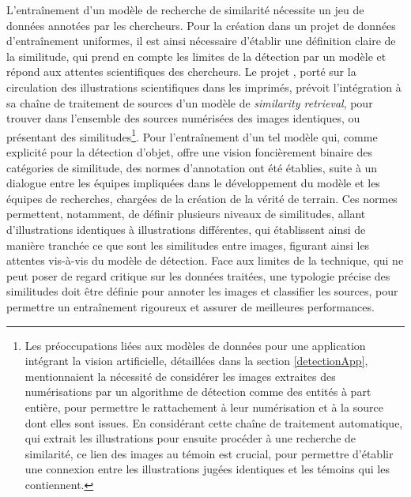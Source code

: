 	L'entraînement d'un modèle de recherche de similarité nécessite un jeu de données annotées par les chercheurs. Pour la création dans un projet de données d'entraînement uniformes, il est ainsi nécessaire d'établir une définition claire de la similitude, qui prend en compte les limites de la détection par un modèle et répond aux attentes scientifiques des chercheurs. Le projet \vhs, porté sur la circulation des illustrations scientifiques dans les imprimés, prévoit l'intégration à sa chaîne de traitement de sources d'un modèle de \textit{similarity retrieval}, pour trouver dans l'ensemble des sources numérisées des images identiques, ou présentant des similitudes\footnote{Les préoccupations liées aux modèles de données pour une application intégrant la vision artificielle, détaillées dans la section \ref{detectionApp}, mentionnaient la nécessité de considérer les images extraites des numérisations par un algorithme de détection comme des entités à part entière, pour permettre le rattachement à leur numérisation et à la source dont elles sont issues. En considérant cette chaîne de traitement automatique, qui extrait les illustrations pour ensuite procéder à une recherche de similarité, ce lien des images au témoin est crucial, pour permettre d'établir une connexion entre les illustrations jugées identiques et les témoins qui les contiennent.}. Pour l'entraînement d'un tel modèle qui, comme explicité pour la détection d'objet, offre une vision foncièrement binaire des catégories de similitude, des normes d'annotation ont été établies, suite à un dialogue entre les équipes impliquées dans le développement du modèle et les équipes de recherches, chargées de la création de la vérité de terrain. Ces normes permettent, notamment, de définir plusieurs niveaux de similitudes, allant d'illustrations identiques à illustrations différentes, qui établissent ainsi de manière tranchée ce que sont les similitudes entre images, figurant ainsi les attentes vis-à-vis du modèle de détection. Face aux limites de la technique, qui ne peut poser de regard critique sur les données traitées, une typologie précise des similitudes doit être définie pour annoter les images et classifier les sources, pour permettre un entraînement rigoureux et assurer de meilleures performances.
	
